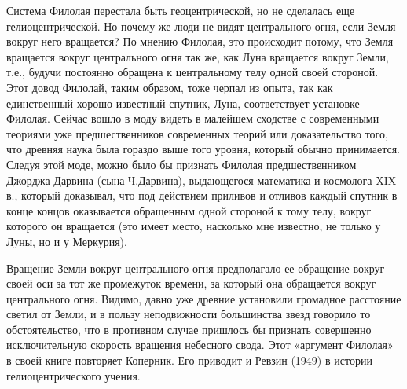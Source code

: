 Система Филолая  перестала быть  геоцентрической, но не  сделалась еще
гелиоцентрической. Но почему же люди  не видят центрального огня, если
Земля вокруг него вращается? По мнению Филолая, это происходит потому,
что  Земля  вращается  вокруг  центрального  огня  так  же,  как  Луна
вращается вокруг Земли, т.е., будучи постоянно обращена к центральному
телу одной  своей стороной.  Этот довод  Филолай, таким  образом, тоже
черпал из опыта, так как  единственный хорошо известный спутник, Луна,
соответствует установке Филолая. Сейчас вошло в моду видеть в малейшем
сходстве  с  современными  теориями уже  предшественников  современных
теорий или  доказательство того, что  древняя наука была  гораздо выше
того уровня, который обычно принимается.  Следуя этой моде, можно было
бы признать Филолая предшественником Джорджа Дарвина (сына Ч.Дарвина),
выдающегося математика и космолога XIX  в., который доказывал, что под
действием приливов и отливов каждый спутник в конце концов оказывается
обращенным одной  стороной к тому  телу, вокруг которого  он вращается
(это имеет  место, насколько мне  известно, не только  у Луны, но  и у
Меркурия).

Вращение  Земли вокруг  центрального  огня  предполагало ее  обращение
вокруг  своей  оси  за  тот  же промежуток  времени,  за  который  она
обращается  вокруг  центрального  огня.   Видимо,  давно  уже  древние
установили  громадное   расстояние  светил   от  Земли,  и   в  пользу
неподвижности  большинства звезд  говорило  то  обстоятельство, что  в
противном  случае  пришлось   бы  признать  совершенно  исключительную
скорость  вращения небесного  свода. Этот  «аргумент Филолая»  в своей
книге  повторяет Коперник.  Его  приводит и  Ревзин  (1949) в  истории
гелиоцентрического учения.

